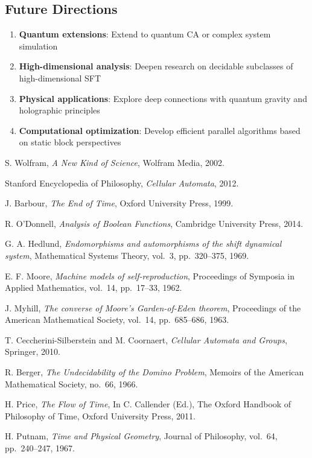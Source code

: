 \documentclass[11pt]{article}
\theoremstyle{definition}
\theoremstyle{remark}
\begin{document}
\subsection{Future Directions}

\begin{enumerate}
\item \textbf{Quantum extensions}: Extend to quantum CA or complex system simulation
\item \textbf{High-dimensional analysis}: Deepen research on decidable subclasses of high-dimensional SFT
\item \textbf{Physical applications}: Explore deep connections with quantum gravity and holographic principles
\item \textbf{Computational optimization}: Develop efficient parallel algorithms based on static block perspectives
\end{enumerate}

\begin{thebibliography}{99}

S. Wolfram,
\textit{A New Kind of Science},
Wolfram Media, 2002.

Stanford Encyclopedia of Philosophy,
\textit{Cellular Automata},
2012.

J. Barbour,
\textit{The End of Time},
Oxford University Press, 1999.

R. O'Donnell,
\textit{Analysis of Boolean Functions},
Cambridge University Press, 2014.

G. A. Hedlund,
\textit{Endomorphisms and automorphisms of the shift dynamical system},
Mathematical Systems Theory, vol.~3, pp.~320--375, 1969.

E. F. Moore,
\textit{Machine models of self-reproduction},
Proceedings of Symposia in Applied Mathematics, vol.~14, pp.~17--33, 1962.

J. Myhill,
\textit{The converse of Moore's Garden-of-Eden theorem},
Proceedings of the American Mathematical Society, vol.~14, pp.~685--686, 1963.

T. Ceccherini-Silberstein and M. Coornaert,
\textit{Cellular Automata and Groups},
Springer, 2010.

R. Berger,
\textit{The Undecidability of the Domino Problem},
Memoirs of the American Mathematical Society, no.~66, 1966.

H. Price,
\textit{The Flow of Time},
In C. Callender (Ed.), The Oxford Handbook of Philosophy of Time, Oxford University Press, 2011.

H. Putnam,
\textit{Time and Physical Geometry},
Journal of Philosophy, vol.~64, pp.~240--247, 1967.

\end{thebibliography}
\end{document}
